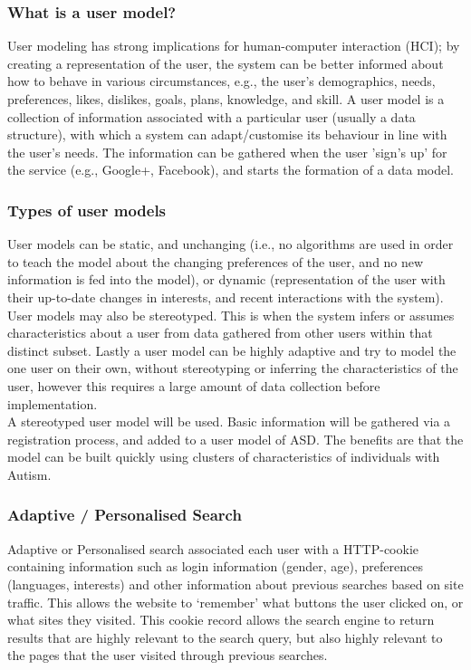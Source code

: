 \documentclass[a4paper, 11pt]{article}
\begin{document}
\subsubsection{What is a user model?}
User modeling has strong implications for human-computer interaction (HCI); by creating a representation of the user, the system can be better informed about how to behave in various circumstances, e.g., the user’s demographics, needs, preferences, likes, dislikes, goals, plans, knowledge, and skill. A user model is a collection of information associated with a particular user (usually a data structure), with which a system can adapt/customise its behaviour in line with the user’s needs. The information can be gathered when the user 'sign's up' for the service (e.g., Google+, Facebook), and starts the formation of a data model. \\

\subsubsection{Types of user models}
User models can be static, and unchanging (i.e., no algorithms are used in order to teach the model about the changing preferences of the user, and no new information is fed into the model), or dynamic (representation of the user with their up-to-date changes in interests, and recent interactions with the system). User models may also be stereotyped. This is when the system infers or assumes characteristics about a user from data gathered from other users within that distinct subset. Lastly a user model can be highly adaptive and try to model the one user on their own, without stereotyping or inferring the characteristics of the user, however this requires a large amount of data collection before implementation.\\
A stereotyped user model will be used. Basic information will be gathered via a registration process, and added to a user model of ASD. The benefits are that the model can be built quickly using clusters of characteristics of individuals with Autism.

\subsubsection{Adaptive / Personalised Search}
Adaptive or Personalised search associated each user with a HTTP-cookie containing information such as login information (gender, age), preferences (languages, interests) and other information about previous searches based on site traffic. This allows the website to ‘remember’ what buttons the user clicked on, or what sites they visited. This cookie record allows the search engine to return results that are highly relevant to the search query, but also highly relevant to the pages that the user visited through previous searches. 
\end{document}
